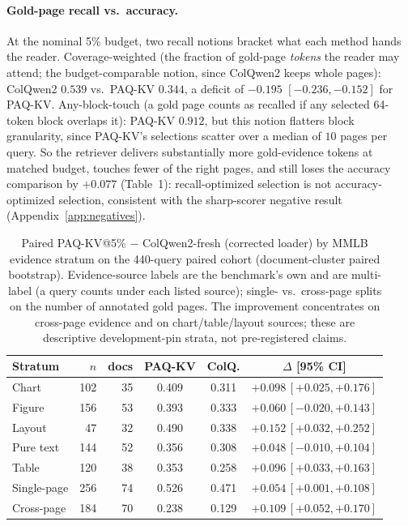\documentclass[letterpaper]{article} %
\newcommand{\paqc}{\textsc{PAQ-KV}}
\begin{document}
\paragraph{Gold-page recall vs.\ accuracy.} At the nominal 5\% budget, two recall notions bracket what each method hands the reader. Coverage-weighted (the fraction of gold-page \emph{tokens} the reader may attend; the budget-comparable notion, since ColQwen2 keeps whole pages): ColQwen2 $0.539$ vs.\ \paqc{} $0.344$, a deficit of $-0.195$ $[-0.236,-0.152]$ for \paqc{}. Any-block-touch (a gold page counts as recalled if any selected 64-token block overlaps it): \paqc{} $0.912$, but this notion flatters block granularity, since \paqc{}'s selections scatter over a median of $10$ pages per query. So the retriever delivers substantially more gold-evidence tokens at matched budget, touches fewer of the right pages, and still loses the accuracy comparison by $+0.077$ (Table~1): recall-optimized selection is not accuracy-optimized selection, consistent with the sharp-scorer negative result (Appendix~\ref{app:negatives}).

\begin{table}[t]
\centering\small
\setlength{\tabcolsep}{1.3pt}%
\begin{tabular}{lrrccc}
\toprule
Stratum & $n$ & docs & \paqc{} & ColQ. & $\Delta$ [95\% CI] \\
\midrule
Chart       & 102 & 35 & 0.409 & 0.311 & $+0.098\,[+0.025,+0.176]$ \\
Figure      & 156 & 53 & 0.393 & 0.333 & $+0.060\,[-0.020,+0.143]$ \\
Layout      &  47 & 32 & 0.490 & 0.338 & $+0.152\,[+0.032,+0.252]$ \\
Pure text   & 144 & 52 & 0.356 & 0.308 & $+0.048\,[-0.010,+0.104]$ \\
Table       & 120 & 38 & 0.353 & 0.258 & $+0.096\,[+0.033,+0.163]$ \\
\midrule
Single-page & 256 & 74 & 0.526 & 0.471 & $+0.054\,[+0.001,+0.108]$ \\
Cross-page  & 184 & 70 & 0.238 & 0.129 & $+0.109\,[+0.052,+0.170]$ \\
\bottomrule
\end{tabular}
\caption{Paired \paqc{}@5\% $-$ ColQwen2-fresh (corrected loader) by MMLB evidence stratum on the 440-query paired cohort (document-cluster paired bootstrap). Evidence-source labels are the benchmark's own and are multi-label (a query counts under each listed source); single- vs.\ cross-page splits on the number of annotated gold pages. The improvement concentrates on cross-page evidence and on chart/table/layout sources; these are descriptive development-pin strata, not pre-registered claims.}
\label{tab:anatomy-strata}
\end{table}
\end{document}
